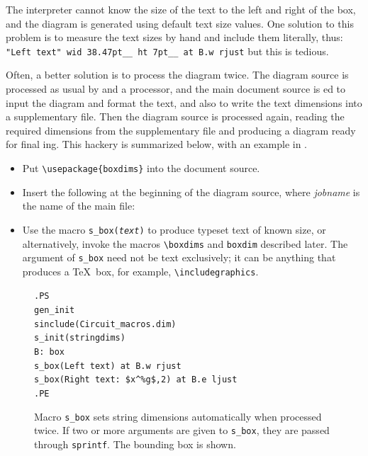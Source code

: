 The \pic interpreter cannot know the size of the text to the left
and right of the box, and the diagram is generated using
default text size values.  One solution to this problem is to measure the
text sizes by hand and include them literally, thus:\hfill\break
\hbox{}\quad%
\verb|"Left text" wid 38.47pt__ ht 7pt__ at B.w rjust|\hfill\break
but this is tedious.

Often, a better solution is to process the diagram twice.  The
diagram source is processed as usual by \Mfour and a \pic processor, and the
main document source is \latex{}ed to input the diagram and format the
text, and also to write the text dimensions into a supplementary file.
Then the diagram source is processed again, reading the required
dimensions from the supplementary file and producing a diagram ready
for final \latex{}ing.
This hackery is summarized below, with an example in .
\begin{itemize}
\item Put \verb|\usepackage{boxdims}| into the document source.
\item Insert the following at the beginning of the diagram source,
 where {\sl jobname} is the name of the main \latex file:\hfill\break
\item Use the macro {\tt s\_box({\sl text})} to produce
 typeset text of known size, or alternatively, invoke the macros
 \verb|\boxdims| and \verb|boxdim| described later.
 The argument of {\tt s\_box} need not be text exclusively; it can
 be anything that produces a \TeX\ box, for example, \verb|\includegraphics|.
\end{itemize}
\begin{figure}[H]
   \parbox{3.5in}{\small\tt.PS\\
     gen\_init\\
     sinclude(Circuit\_macros.dim)\\
     s\_init(stringdims)\\
     B: box\\
       \hbox{}\quad s\_box(Left text) at B.w rjust\\
       \hbox{}\quad s\_box(Right text: \$x\^{}{\%g}\$,2) at B.e ljust\\
     .PE}%
   \hfill\llap{\raise-0.25in\hbox{ }}%
   \caption{Macro {\tt s\_box} sets string dimensions automatically
    when processed twice.  If two or more arguments are
    given to {\tt s\_box}, they
    are passed through {\tt sprintf}.  The bounding box is shown.}
   \label{stringdim}
   \end{figure}

